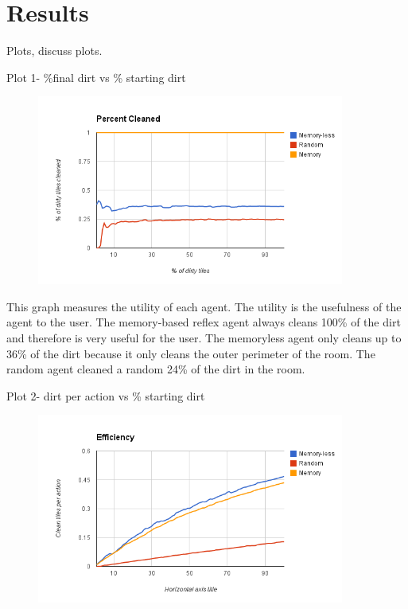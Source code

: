 \documentclass[a4paper,10pt]{article}
\begin{document}
\section{Results}
Plots, discuss plots.

Plot 1- \%final dirt vs \% starting dirt \\
\begin{figure}[H]
	\begin{center}
		\includegraphics[width=0.9\textwidth]{image.png}
	\end{center}
\end{figure}
This graph measures the utility of each agent.
The utility is the usefulness of the agent to the user. 
The memory-based reflex agent always cleans 100\% of the dirt and therefore is very useful for the user.
The memoryless agent only cleans up to 36\% of the dirt because it only cleans the outer perimeter of the room.
The random agent cleaned a random 24\% of the dirt in the room. 

Plot 2- dirt per action vs \% starting dirt
\begin{figure}[H]
	\includegraphics[width=0.9\textwidth]{image1.png}
\end{figure}
\end{document}

